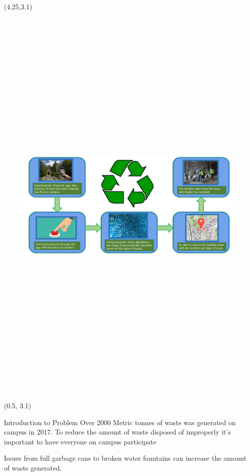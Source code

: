 \documentclass[22pt]{beamer}
\begin{document}
\begin{frame}[fragile]
\begin{textblock}{7}(4.25,3.1)
\begin{figure}[htbp] %
 \centering
\includegraphics[height=20cm]{flowchart.png}
\end{figure}
\end{textblock}

\begin{textblock}{3.5}(0.5, 3.1)
\begin{block}{Introduction to Problem}
Over 2000 Metric tonnes of waste was generated on campus in 2017. To reduce the amount of waste disposed of improperly it’s important to have everyone on campus participate \par

Issues from full garbage cans to broken water fountains can increase the amount of waste generated. \par


\end{block}
\end{textblock}
\end{frame}
\end{document}

